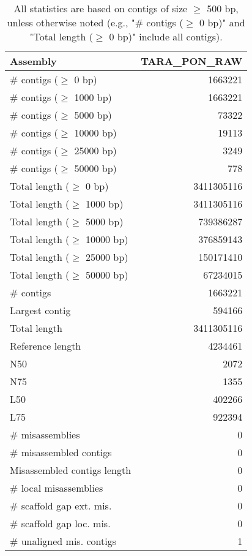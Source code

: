 \documentclass[12pt,a4paper]{article}
\begin{document}
\begin{table}[ht]
\begin{center}
\caption{All statistics are based on contigs of size $\geq$ 500 bp, unless otherwise noted (e.g., "\# contigs ($\geq$ 0 bp)" and "Total length ($\geq$ 0 bp)" include all contigs).}
\begin{tabular}{|l*{1}{|r}|}
\hline
Assembly & TARA\_PON\_RAW \\ \hline
\# contigs ($\geq$ 0 bp) & 1663221 \\ \hline
\# contigs ($\geq$ 1000 bp) & 1663221 \\ \hline
\# contigs ($\geq$ 5000 bp) & 73322 \\ \hline
\# contigs ($\geq$ 10000 bp) & 19113 \\ \hline
\# contigs ($\geq$ 25000 bp) & 3249 \\ \hline
\# contigs ($\geq$ 50000 bp) & 778 \\ \hline
Total length ($\geq$ 0 bp) & 3411305116 \\ \hline
Total length ($\geq$ 1000 bp) & 3411305116 \\ \hline
Total length ($\geq$ 5000 bp) & 739386287 \\ \hline
Total length ($\geq$ 10000 bp) & 376859143 \\ \hline
Total length ($\geq$ 25000 bp) & 150171410 \\ \hline
Total length ($\geq$ 50000 bp) & 67234015 \\ \hline
\# contigs & 1663221 \\ \hline
Largest contig & 594166 \\ \hline
Total length & 3411305116 \\ \hline
Reference length & 4234461 \\ \hline
N50 & 2072 \\ \hline
N75 & 1355 \\ \hline
L50 & 402266 \\ \hline
L75 & 922394 \\ \hline
\# misassemblies & 0 \\ \hline
\# misassembled contigs & 0 \\ \hline
Misassembled contigs length & 0 \\ \hline
\# local misassemblies & 0 \\ \hline
\# scaffold gap ext. mis. & 0 \\ \hline
\# scaffold gap loc. mis. & 0 \\ \hline
\# unaligned mis. contigs & 1 \\ \hline

\end{tabular}
\end{center}
\end{table}
\end{document}
